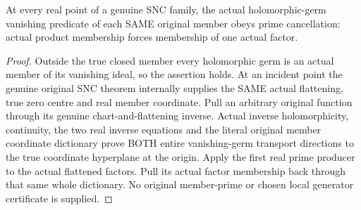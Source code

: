 \begin{theorem}
\label{hir:sharp-actual-snc-member-vanishing-prime}
\leanok
At every real point of a genuine SNC family, the actual holomorphic-germ
vanishing predicate of each SAME original member obeys prime cancellation:
actual product membership forces membership of one actual factor.
\end{theorem}
\begin{proof}
Outside the true closed member every holomorphic germ is an actual member of
its vanishing ideal, so the assertion holds. At an incident point the genuine
original SNC theorem internally supplies the SAME actual flattening, true
zero centre and real member coordinate. Pull an arbitrary original function
through its genuine chart-and-flattening inverse. Actual inverse holomorphicity,
continuity, the two real inverse equations and the literal original member
coordinate dictionary prove BOTH entire vanishing-germ transport directions
to the true coordinate hyperplane at the origin. Apply the first real prime
producer to the actual flattened factors. Pull its actual factor membership
back through that same whole dictionary. No original member-prime or chosen
local generator certificate is supplied.
\end{proof}

